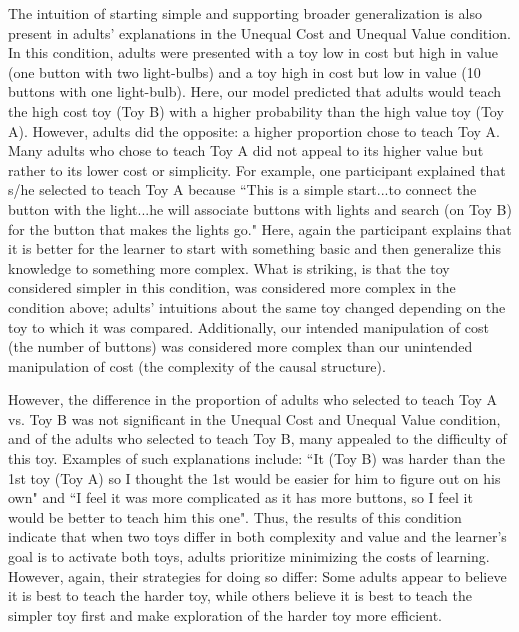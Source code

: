 \documentclass[10pt,letterpaper]{article}
\begin{document}
The intuition of starting simple and supporting broader generalization is also present in adults' explanations in the Unequal Cost and Unequal Value condition. In this condition, adults were presented with a toy low in cost but high in value (one button with two light-bulbs) and a toy high in cost but low in value (10 buttons with one light-bulb). Here, our model predicted that adults would teach the high cost toy (Toy B) with a higher probability than the high value toy (Toy A). However, adults did the opposite: a higher proportion chose to teach Toy A. Many adults who chose to teach Toy A did not appeal to its higher value but rather to its lower cost or simplicity. For example, one participant explained that s/he selected to teach Toy A because ``This is a simple start...to connect the button with the light...he will associate buttons with lights and search (on Toy B) for the button that makes the lights go." Here, again the participant explains that it is better for the learner to start with something basic and then generalize this knowledge to something more complex. What is striking, is that the toy considered simpler in this condition, was considered more complex in the condition above; adults' intuitions about the same toy changed depending on the toy to which it was compared. Additionally, our intended manipulation of cost (the number of buttons) was considered more complex than our unintended manipulation of cost (the complexity of the causal structure). 

However, the difference in the proportion of adults who selected to teach Toy A vs. Toy B was not significant in the Unequal Cost and Unequal Value condition, and of the adults who selected to teach Toy B, many appealed to the difficulty of this toy. Examples of such explanations include: ``It (Toy B) was harder than the 1st toy (Toy A) so I thought the 1st would be easier for him to figure out on his own" and ``I feel it was more complicated as it has more buttons, so I feel it would be better to teach him this one". Thus,  the results of this condition indicate that when two toys differ in both complexity and value and the learner's goal is to activate both toys, adults prioritize minimizing the costs of learning. However, again, their strategies for doing so differ: Some adults appear to believe it is best to teach the harder toy, while others believe it is best to teach the simpler toy first and make exploration of the harder toy more efficient. 
\end{document}

